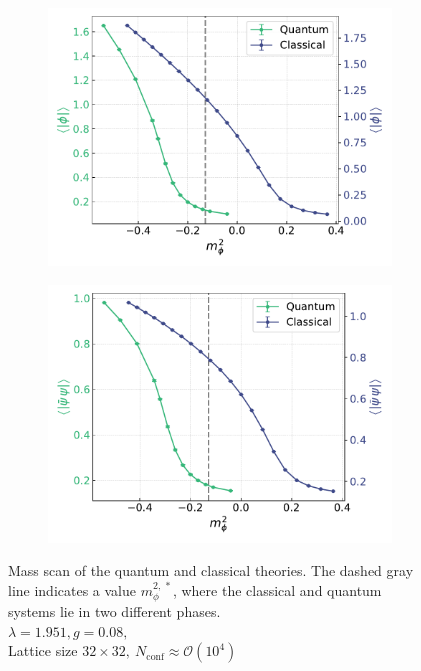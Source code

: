 \begin{figure}[h]
    \centering
    \captionsetup[subfigure]{justification=centering}
    \begin{subfigure}[t]{0.48\textwidth}
        \centering
        \includegraphics[width=1.05\textwidth]{figures/chiral_PT/mass_scan/magnetisation.pdf}
    \end{subfigure}
    \hfill
    \begin{subfigure}[t]{0.48\textwidth}
        \centering
        \includegraphics[width=1.05\textwidth]{figures/chiral_PT/mass_scan/condensate.pdf}
    \end{subfigure}
    \caption[Mass scan of the quantum and classical theories]{Mass scan of the quantum and classical theories. The dashed gray line indicates a value $m_\phi^{2, \,*}$, where the classical and quantum systems lie in two different phases. \\
    $\lambda=1.951, g=0.08,$ \\ Lattice size $32 \times 32, \ N_\text{conf} \approx \mathcal{O}(10^4)$}
    \label{fig:scans_classical_quantum}
\end{figure} 
